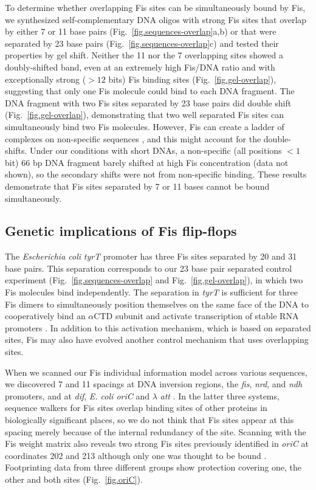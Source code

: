 \documentclass[doublespacing]{narfront}
\newcommand{\fig}[1]{Fig.~\ref{#1}} %
\newcommand{\figmargin}[1]{\marginpar{\textcolor{blue}{$\Leftarrow$Fig \ref{#1}}}}
\begin{document}
To determine whether overlapping Fis sites
can be simultaneously bound by Fis,
we synthesized self-complementary DNA oligos with
strong Fis sites that
overlap by either 7 or 11 base pairs
(\fig{fig.sequences-overlap}a,b)\figmargin{fig.sequences-overlap}
or that were separated by 23 base pairs
(\fig{fig.sequences-overlap}c)
and tested
their properties by gel shift.
Neither the 11 nor the 7 overlapping sites
showed a doubly-shifted band, even at an extremely high Fis/DNA ratio
and with exceptionally strong ($>12$ bits) Fis binding sites
(\fig{fig.gel-overlap}),\figmargin{fig.gel-overlap}
suggesting that only one Fis molecule could bind
to each DNA fragment.
The DNA fragment with two Fis sites separated by 23 base pairs
did double shift (\fig{fig.gel-overlap}),
demonstrating that two well separated Fis sites
can simultaneously bind two Fis molecules.
However, Fis can create a ladder of complexes
on non-specific sequences
\cite{Betermier1994}, and this might account for the double-shifts.
Under our conditions with short DNAs,
a non-specific
(all positions $< 1$ bit)
66 bp DNA fragment barely shifted
at high Fis concentration
(data not shown),
so the secondary shifts were not from non-specific binding.
These results demonstrate that Fis sites separated by 7 or 11 bases
cannot be bound simultaneously.

\subsection*{Genetic implications of Fis flip-flops}

The \emph{Escherichia coli} \emph{tyrT} promoter has
three Fis sites separated by 20 and 31 base pairs.
This separation corresponds to
our 23 base pair separated control experiment
(\fig{fig.sequences-overlap} and \fig{fig.gel-overlap}),
in which two Fis molecules bind independently.
The separation
in \emph{tyrT} is sufficient for three Fis dimers
to simultaneously position themselves on the same face of the DNA
to cooperatively bind
an $\alpha$CTD
subunit
and activate transcription of stable RNA promoters
\cite{Muskhelishvili1995}.
In addition to this activation mechanism,
which is based on separated sites,
Fis may also have evolved another control mechanism
that uses overlapping sites.

When we scanned our Fis individual information model across
various sequences,
we discovered
7 and 11 spacings at
DNA inversion regions,
the \emph{fis},
\emph{nrd},
and \emph{ndh} promoters, 
and at
\emph{dif},
\emph{E. coli oriC}
and
$\lambda$ \emph{att}
\cite{Schneider.walker,Hengen.fisinfo}.
In the latter three systems,
sequence walkers for
Fis sites overlap binding sites of other
proteins in biologically significant places,
so we do not think
that Fis sites appear at this spacing merely because
of the internal redundancy of the site.
Scanning with the Fis weight matrix also reveals two
strong Fis sites previously identified in \emph{oriC}
at coordinates
202 and 213
although only one was thought to be bound
\cite{Gille1991,Roth1994,Messer1992}.
Footprinting data from
three different groups show protection
covering one, the other and both sites
(\fig{fig.oriC}).\figmargin{fig.oriC}
\end{document}
